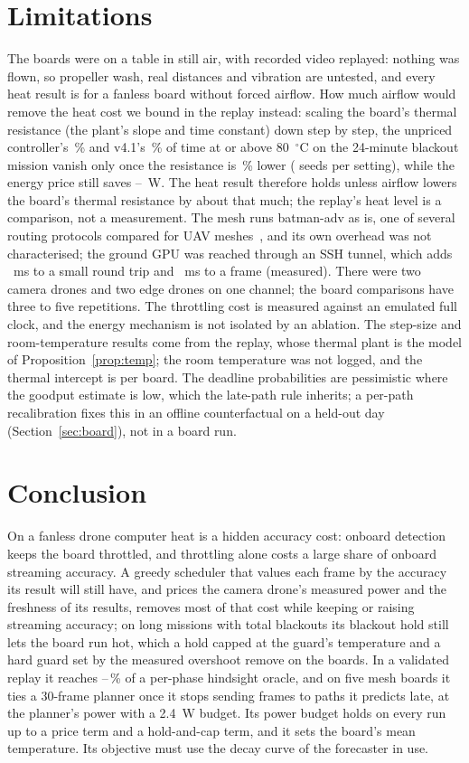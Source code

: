 \documentclass[conference]{IEEEtran}
\begin{document}
\section{Limitations}
The boards were on a table in still air, with recorded video replayed: nothing was flown, so propeller wash, real
distances and vibration are untested, and every heat result is for a fanless board without forced airflow. How much
airflow would remove the heat cost we bound in the replay instead: scaling the board's thermal resistance (the plant's
slope and time constant) down step by step, the unpriced controller's \AfNoHot\,\% and v4.1's \AfVHot\,\% of time at or above
80~$^\circ$C on the 24-minute blackout mission vanish only once the resistance is \AfVZero\,\% lower (\AfSeeds{} seeds per
setting), while the energy price still saves \AfSaveMin--\AfSaveMax~W. The heat result therefore holds unless airflow
lowers the board's thermal resistance by about that much; the replay's heat level is a comparison, not a measurement. The mesh
runs batman-adv as is, one of several routing protocols compared for UAV meshes~\cite{Diniz_2025}, and its own overhead
was not characterised; the ground GPU was reached through an SSH tunnel, which adds \BdTunnelSmall~ms to a small round
trip and \BdTunnelFrame~ms to a frame (measured). There were two camera drones and two edge drones on one channel; the
board comparisons have three to five repetitions. The throttling cost is measured against an emulated full clock, and
the energy mechanism is not isolated by an ablation. The step-size and room-temperature results come from the replay,
whose thermal plant is the model of Proposition~\ref{prop:temp}; the room temperature was not logged, and the thermal
intercept is per board. The deadline probabilities are pessimistic where the goodput estimate is low, which the
late-path rule inherits; a per-path recalibration fixes this in an offline counterfactual on a held-out day
(Section~\ref{sec:board}), not in a board run.

\section{Conclusion}
On a fanless drone computer heat is a hidden accuracy cost: onboard detection keeps the board throttled, and
throttling alone costs a large share of onboard streaming accuracy. A greedy scheduler that values each frame by the
accuracy its result will still have, and prices the camera drone's measured power and the freshness of its results,
removes most of that cost while keeping or raising streaming accuracy; on long missions with total blackouts its
blackout hold still lets the board run hot, which a hold capped at the guard's temperature and a hard guard set by the
measured overshoot remove on the boards. In a validated replay it reaches
\OracleShareMin--\OracleShareMax\,\% of a per-phase hindsight oracle, and on five mesh boards it ties a 30-frame planner
once it stops sending frames to paths it predicts late, at the planner's power with a 2.4~W budget. Its power budget holds on every run up to a price
term and a hold-and-cap term, and it sets the board's mean temperature. Its objective must use the decay curve of the forecaster in use.



\end{document}
